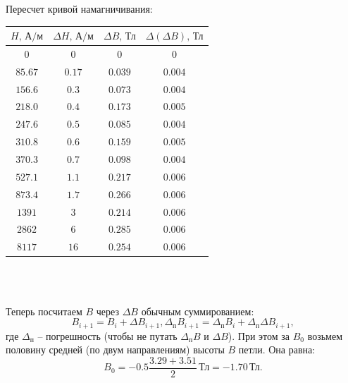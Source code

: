 \documentclass[a4paper]{article}
\begin{document}
\begin{enumerate}
Пересчет кривой намагничивания:
\begin{center}
\begin{tabular}{|c|c|c|c|}\hline
$H\text{, А/м}$&$\Delta H\text{, А/м}$&$\Delta B\text{, Тл}$&$\Delta (\Delta B)\text{, Тл}$\\\hline
$0$&$0$&$0$&$0$\\\hline
$85.67$&$0.17$&$0.039$&$0.004$\\\hline
$156.6$&$0.3$&$0.073$&$0.004$\\\hline
$218.0$&$0.4$&$0.173$&$0.005$\\\hline
$247.6$&$0.5$&$0.085$&$0.004$\\\hline
$310.8$&$0.6$&$0.159$&$0.005$\\\hline
$370.3$&$0.7$&$0.098$&$0.004$\\\hline
$527.1$&$1.1$&$0.217$&$0.006$\\\hline
$873.4$&$1.7$&$0.266$&$0.006$\\\hline
$1391$&$3$&$0.214$&$0.006$\\\hline
$2862$&$6$&$0.285$&$0.006$\\\hline
$8117$&$16$&$0.254$&$0.006$\\\hline
\end{tabular}\\~\\
\end{center}
Теперь посчитаем $B$ через $\Delta B$ обычным суммированием:
$$B_{i+1} = B_{i} + \Delta B_{i+1}, \Delta_\text{п} B_{i+1} = \Delta_\text{п} B_{i} + \Delta_\text{п} \Delta B_{i+1},$$
где $\Delta_\text{п}$ -- погрешность (чтобы не путать $\Delta_\text{п} B$ и $\Delta B$).
При этом за $B_0$ возьмем половину средней (по двум направлениям) высоты $B$ петли. Она равна:
$$B_0 = -0.5 \frac{3.29 + 3.51}{2}\,\text{Тл} = -1.70\,\text{Тл}.$$


\end{enumerate}
\end{document}
